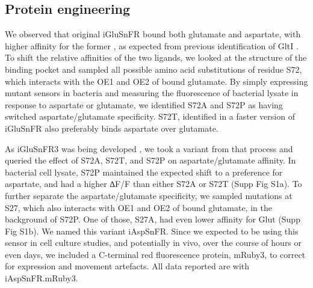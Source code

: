 \documentclass[9pt,lineno]{elife}
\begin{document}
\subsection{Protein engineering}
We observed that original iGluSnFR bound both glutamate and aspartate, with higher affinity for the former \citep{Marvin2013-qq}, as expected from previous identification of GltI \citep{Hu2008-nd}.
To shift the relative affinities of the two ligands, we looked at the structure of the binding pocket and sampled all possible amino acid substitutions of residue S72, which interacts with the OE1 and OE2 of bound glutamate.
By simply expressing mutant sensors in bacteria and measuring the fluorescence of bacterial lysate in response to aspartate or glutamate, we identified S72A and S72P as having switched aspartate/glutamate specificity.
S72T, identified in a faster version of iGluSnFR \citep{Helassa2018-fb} also preferably binds aspartate over glutamate. 

As iGluSnFR3 was being developed \citep{Aggarwal2023-pi}, we took a variant from that process and queried the effect of S72A, S72T, and S72P on aspartate/glutamate affinity.
In bacterial cell lysate, S72P maintained the expected shift to a preference for aspartate, and had a higher ∆F/F than either S72A or S72T (Supp Fig S1a).
To further separate the aspartate/glutamate specificity, we sampled mutations at S27, which also interacts with OE1 and OE2 of bound glutamate, in the background of S72P.
One of those, S27A, had even lower affinity for Glut (Supp Fig S1b). We named this variant iAspSnFR. Since we expected to be using this sensor in cell culture studies, and potentially in vivo, over the course of hours or even days, we included a C-terminal red fluorescence protein, mRuby3, to correct for expression and movement artefacts. All data reported are with iAspSnFR.mRuby3.
\end{document}

